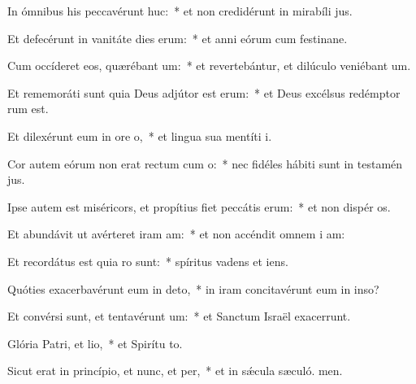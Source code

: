 \item In ómnibus his peccavérunt huc:~* et non credidérunt in mirabíli jus.
\item Et defecérunt in vanitáte dies erum:~* et anni eórum cum festinane.
\item Cum occíderet eos, quærébant um:~* et revertebántur, et dilúculo veniébant  um.
\item Et rememoráti sunt quia Deus adjútor est erum:~* et Deus excélsus redémptor rum est.
\item Et dilexérunt eum in ore o,~* et lingua sua mentíti  i.
\item Cor autem eórum non erat rectum cum o:~* nec fidéles hábiti sunt in testamén jus.
\item Ipse autem est miséricors, et propítius fiet peccátis erum:~* et non dispér os.
\item Et abundávit ut avérteret iram am:~* et non accéndit omnem i am:
\item Et recordátus est quia ro sunt:~* spíritus vadens et  iens.
\item Quóties exacerbavérunt eum in deto,~* in iram concitavérunt eum in inso?
\item Et convérsi sunt, et tentavérunt um:~* et Sanctum Israël exacerrunt.
\item Glória Patri, et lio,~* et Spirítu to.
\item Sicut erat in princípio, et nunc, et per,~* et in sǽcula sæculó. men.

